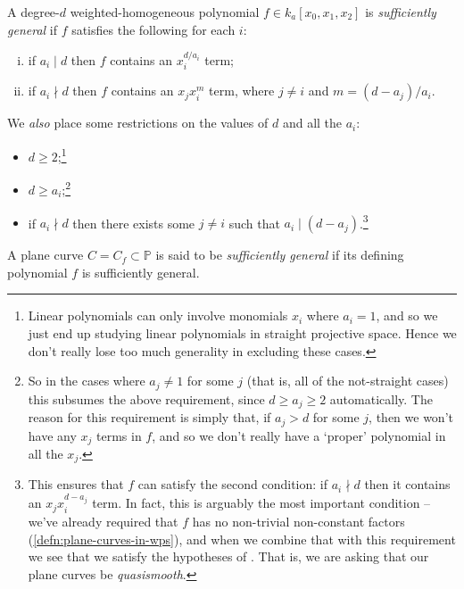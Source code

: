 \documentclass[10pt,notitlepage]{article}
\numberwithin{equation}{subsection}
\newcommand{\pee}{\mathbb{P}}
\newcommand{\kathree}{k_a[x_0,x_1,x_2]}
\begin{document}
            \begin{definition}\label{defn:suff-general}
                A degree-$d$ weighted-homogeneous polynomial $f\in\kathree$ is \emph{sufficiently general} if $f$ satisfies the following for each $i$:
                \begin{enumerate}[(i)]
                    \item if $a_i\mid d$ then $f$ contains an $x_i^{d/a_i}$ term;
                    \item if $a_i\nmid d$ then $f$ contains an $x_jx_i^m$ term, where $j\neq i$ and $m=(d-a_j)/a_i$.
                \end{enumerate}
                We \emph{also} place some restrictions on the values of $d$ and all the $a_i$:
                \begin{itemize}
                    \item $d\geqslant2$;\footnote{%
                        Linear polynomials can only involve monomials $x_i$ where $a_i=1$, and so we just end up studying linear polynomials in straight projective space.
                        Hence we don't really lose too much generality in excluding these cases.
                    }
                    \item $d\geqslant a_i$;\footnote{%
                        So in the cases where $a_j\neq1$ for some $j$ (that is, all of the not-straight cases) this subsumes the above requirement, since $d\geqslant a_j\geqslant2$ automatically.
                        The reason for this requirement is simply that, if $a_j>d$ for some $j$, then we won't have any $x_j$ terms in $f$, and so we don't really have a `proper' polynomial in all the $x_j$.
                    }
                    \item if $a_i\nmid d$ then there exists some $j\neq i$ such that $a_i\mid(d-a_j)$.\footnote{%
                        This ensures that $f$ can satisfy the second condition: if $a_i\nmid d$ then it contains an $x_jx_i^{d-a_j}$ term.
                        In fact, this is arguably the most important condition -- we've already required that $f$ has no non-trivial non-constant factors (\cref{defn:plane-curves-in-wps}), and when we combine that with this requirement we see that we satisfy the hypotheses of \cite[8.4~Corollary]{IanoFletcher:2015wc}.
                        That is, we are asking that our plane curves be \emph{quasismooth}.
                    }
                \end{itemize}

                A plane curve $C=C_f\subset\pee$ is said to be \emph{sufficiently general} if its defining polynomial $f$ is sufficiently general.
            \end{definition}
\end{document}
